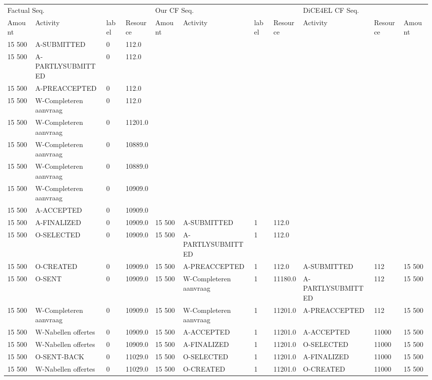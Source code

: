 \begin{tabular}{lllllllllll}
\toprule
\multicolumn{4}{l}{Factual Seq.} & \multicolumn{4}{l}{Our CF Seq.} & \multicolumn{3}{l}{DiCE4EL CF Seq.} \\
Amount & Activity & label & Resource & Amount & Activity & label & Resource & Activity & Resource & Amount \\
\midrule
15 500 & A-SUBMITTED & 0 & 112.0 &  &  &  &  &  &  &  \\
15 500 & A-PARTLYSUBMITTED & 0 & 112.0 &  &  &  &  &  &  &  \\
15 500 & A-PREACCEPTED & 0 & 112.0 &  &  &  &  &  &  &  \\
15 500 & W-Completeren aanvraag & 0 & 112.0 &  &  &  &  &  &  &  \\
15 500 & W-Completeren aanvraag & 0 & 11201.0 &  &  &  &  &  &  &  \\
15 500 & W-Completeren aanvraag & 0 & 10889.0 &  &  &  &  &  &  &  \\
15 500 & W-Completeren aanvraag & 0 & 10889.0 &  &  &  &  &  &  &  \\
15 500 & W-Completeren aanvraag & 0 & 10909.0 &  &  &  &  &  &  &  \\
15 500 & A-ACCEPTED & 0 & 10909.0 &  &  &  &  &  &  &  \\
15 500 & A-FINALIZED & 0 & 10909.0 & 15 500 & A-SUBMITTED & 1 & 112.0 &  &  &  \\
15 500 & O-SELECTED & 0 & 10909.0 & 15 500 & A-PARTLYSUBMITTED & 1 & 112.0 &  &  &  \\
15 500 & O-CREATED & 0 & 10909.0 & 15 500 & A-PREACCEPTED & 1 & 112.0 & A-SUBMITTED & 112 & 15 500 \\
15 500 & O-SENT & 0 & 10909.0 & 15 500 & W-Completeren aanvraag & 1 & 11180.0 & A-PARTLYSUBMITTED & 112 & 15 500 \\
15 500 & W-Completeren aanvraag & 0 & 10909.0 & 15 500 & W-Completeren aanvraag & 1 & 11201.0 & A-PREACCEPTED & 112 & 15 500 \\
15 500 & W-Nabellen offertes & 0 & 10909.0 & 15 500 & A-ACCEPTED & 1 & 11201.0 & A-ACCEPTED & 11000 & 15 500 \\
15 500 & W-Nabellen offertes & 0 & 10909.0 & 15 500 & A-FINALIZED & 1 & 11201.0 & O-SELECTED & 11000 & 15 500 \\
15 500 & O-SENT-BACK & 0 & 11029.0 & 15 500 & O-SELECTED & 1 & 11201.0 & A-FINALIZED & 11000 & 15 500 \\
15 500 & W-Nabellen offertes & 0 & 11029.0 & 15 500 & O-CREATED & 1 & 11201.0 & O-CREATED & 11000 & 15 500 \\

\end{tabular}
